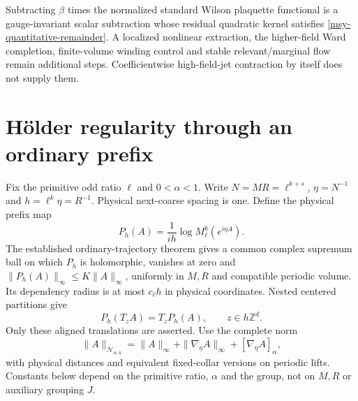 \documentclass[11pt]{article}
\theoremstyle{remark}
\begin{document}
Subtracting \(\beta\) times the normalized standard Wilson
plaquette functional is a gauge-invariant scalar subtraction
whose residual quadratic kernel satisfies
\eqref{msy-quantitative-remainder}. A localized nonlinear
extraction, the higher-field Ward completion, finite-volume
winding control and stable relevant/marginal flow remain
additional steps. Coefficientwise high-field-jet
contraction by itself does not supply them.

\section{H\"older regularity through an ordinary prefix}
\label{pgh-section}

Fix the primitive odd ratio $\ell$ and $0<\alpha<1$. Write
$N=MR=\ell^{k+s}$, $\eta=N^{-1}$ and $h=\ell^k\eta=R^{-1}$.
Physical next-coarse spacing is one. Define the physical prefix map
\begin{equation}
 P_h(A)=\frac1{ih}\log M_\ell^k(e^{i\eta A}).
 \label{pgh-prefix}
\end{equation}
The established ordinary-trajectory theorem gives a common complex
supremum ball on which $P_h$ is holomorphic, vanishes at zero and
$\|P_h(A)\|_\infty\le K\|A\|_\infty$, uniformly in $M,R$ and
compatible periodic volume. Its dependency radius is at most
$c_\ell h$ in physical coordinates. Nested centered partitions give
\begin{equation}
 P_h(T_zA)=T_zP_h(A),\qquad z\in h\mathbb Z^d.
 \label{pgh-covariance}
\end{equation}
Only these aligned translations are asserted. Use the complete norm
\[
 \|A\|_{\mathcal N_{\alpha,\eta}}
 =\|A\|_\infty+\|\nabla_\eta A\|_\infty
                         +[\nabla_\eta A]_\alpha,
\]
with physical distances and equivalent fixed-collar versions on
periodic lifts. Constants below depend on the primitive ratio,
$\alpha$ and the group, not on $M,R$ or auxiliary grouping $J$.
\end{document}
